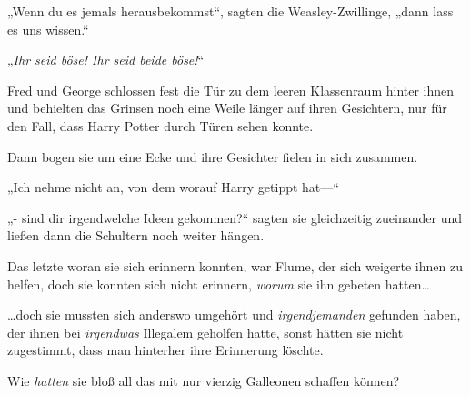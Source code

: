 „Wenn du es jemals herausbekommst“, sagten die Weasley-Zwillinge, „dann lass es uns wissen.“

„\emph{Ihr seid böse! Ihr seid beide böse!}“

Fred und George schlossen fest die Tür zu dem leeren Klassenraum hinter ihnen und behielten das Grinsen noch eine Weile länger auf ihren Gesichtern, nur für den Fall, dass Harry Potter durch Türen sehen konnte.

Dann bogen sie um eine Ecke und ihre Gesichter fielen in sich zusammen.

„Ich nehme nicht an, von dem worauf Harry getippt hat—“

„- sind dir irgendwelche Ideen gekommen?“ sagten sie gleichzeitig zueinander und ließen dann die Schultern noch weiter hängen.

Das letzte woran sie sich erinnern konnten, war Flume, der sich weigerte ihnen zu helfen, doch sie konnten sich nicht erinnern, \emph{worum} sie ihn gebeten hatten…

…doch sie mussten sich anderswo umgehört und \emph{irgendjemanden} gefunden haben, der ihnen bei \emph{irgendwas} Illegalem geholfen hatte, sonst hätten sie nicht zugestimmt, dass man hinterher ihre Erinnerung löschte.

Wie \emph{hatten} sie bloß all das mit nur vierzig Galleonen schaffen können?

